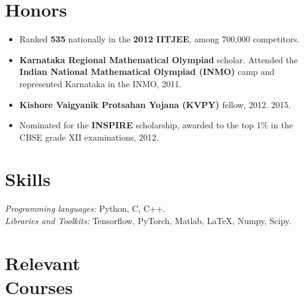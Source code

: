 \documentclass[margin, 11pt]{res} %
\begin{document}
\begin{resume}

\section{\large Honors}
\begin{itemize}\itemsep -2pt
	\item Ranked {\bf 535} nationally in the {\bf 2012 IITJEE}, among 700,000 competitors.
	\item {\bf Karnataka Regional Mathematical Olympiad} scholar. Attended the {\bf Indian National Mathematical Olympiad (INMO)} camp and represented Karnataka
	in the INMO, 2011.
	\item {\bf Kishore Vaigyanik Protsahan Yojana (KVPY)} fellow, 2012.
	2015.
	\item Nominated for the {\bf INSPIRE} scholarship, awarded to the top 1\% in the CBSE grade XII
	examinations, 2012.
\end{itemize}


\section{\large Skills}
{\sl Programming languages:} Python, C, C++.\\
{\sl Libraries and Toolkits:} Tensorflow, PyTorch, Matlab, \LaTeX, Numpy, Scipy.

\section{\large Relevant \\ Courses}


\end{resume}
\end{document}
